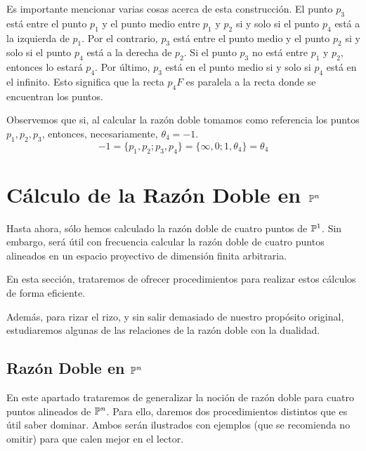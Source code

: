 Es importante mencionar varias cosas acerca de esta construcción. El punto $p_3$ está entre el punto $p_1$ y el punto medio entre $p_1$ y $p_2$ si y solo si el punto $p_4$ está a la izquierda de $p_1$. Por el contrario, $p_3$ está entre el punto medio y el punto $p_2$  si y solo si el punto $p_4$ está a la derecha de $p_2$. Si el punto $p_3$ no está entre $p_1$ y $p_2$, entonces lo estará $p_4$. Por último, $p_3$ está en el punto medio si y solo si $p_4$ está en el infinito. Esto significa que la recta $p_4F$ es paralela a la recta donde se encuentran los puntos.

Observemos que si, al calcular la razón doble tomamos como referencia los puntos $p_1,p_2,p_3$, entonces, necesariamente, $\theta_4=-1$.
\begin{equation*}
	-1=\{p_1,p_2;p_3,p_4\}=\{\infty,0;1,\theta_4\}=\theta_4
\end{equation*}

\section{Cálculo de la Razón Doble en $\mathbb{P}^n$}
\label{C5_generalizacionesRazonDoble}
Hasta ahora, sólo hemos calculado la razón doble de cuatro puntos de $\mathbb{P}^1$. Sin embargo, será útil con frecuencia calcular la razón doble de cuatro puntos alineados en un espacio proyectivo de dimensión finita arbitraria.
 
En esta sección, trataremos de ofrecer procedimientos para realizar estos cálculos de forma eficiente.

Además, para rizar el rizo, y sin salir demasiado de nuestro propósito original, estudiaremos algunas de las relaciones de la razón doble con la dualidad.
\subsection{Razón Doble en $\mathbb{P}^n$}
En este apartado trataremos de generalizar la noción de razón doble para cuatro puntos alineados de $\mathbb{P}^n$. Para ello, daremos dos procedimientos distintos que es útil saber dominar. Ambos serán ilustrados con ejemplos (que se recomienda no omitir) para que calen mejor en el lector.
